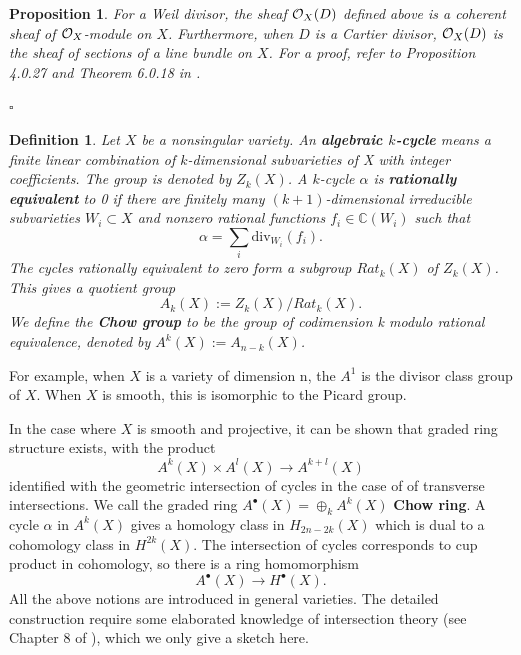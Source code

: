 \documentclass[11pt]{article}
\newtheorem{prop}[thm]{Proposition}
\newtheorem{dfn}[thm]{Definition}
\newcommand{\cplx}{\mathbb C}
\newcommand{\calo}{{\cal O}}
\renewcommand{\qedsymbol}{$\square$}
\begin{document}
\begin{prop}
For a Weil divisor, the sheaf $\calo_X(D)$ defined above is a coherent sheaf of $\calo_X$-module on $X$. Furthermore, when $D$ is a Cartier divisor, $\calo_X(D)$ is the sheaf of sections of a line bundle on $X$.
For a proof, refer to Proposition 4.0.27 and Theorem 6.0.18 in \cite{cox2009toric}. 
\begin{flushright}
	\qedsymbol
\end{flushright}
\end{prop}

\begin{dfn}

	Let $X$ be a nonsingular variety. An \textbf{algebraic $k$-cycle} means a finite linear combination of $k$-dimensional subvarieties of X with integer coefficients. The group is denoted by $Z_k(X)$. A $k$-cycle $\alpha$ is \textbf{rationally equivalent} to 0 if there are finitely many $(k+1)$-dimensional irreducible subvarieties $W_i\subset X$ and nonzero rational functions $f_i\in\cplx(W_i)$ such that
	\begin{equation*}
	\alpha=\sum_i \text{div}_{W_i}(f_i).
	\end{equation*}
	The cycles rationally equivalent to zero form a subgroup $Rat_k(X)$ of $Z_k(X)$. This gives a quotient group
	\begin{equation*}
		A_k(X):=Z_k(X)/Rat_k(X).
	\end{equation*}
	We define the \textbf{Chow group} to be the group of codimension k modulo rational equivalence, denoted by $A^k(X):=A_{n-k}(X)$.
\end{dfn}
For example, when $X$ is a variety of dimension n, the $A^1$ is the divisor class group of $X$. When $X$ is smooth, this is isomorphic to the Picard group.

In the case where $X$ is smooth and projective, it can be shown that graded ring structure exists, with the product
\begin{equation*}
	A^k(X)\times A^{l}(X)\rightarrow A^{k+l}(X)
\end{equation*}
identified with the geometric intersection of cycles in the case of of transverse intersections. We call the graded ring $A^{\bullet}(X)=\oplus_k A^k(X)$ \textbf{Chow ring}. A cycle $\alpha$ in $A^k(X)$ gives a homology class in $H_{2n-2k}(X)$ which is dual to a cohomology class in $H^{2k}(X)$. The intersection of cycles corresponds to cup product in cohomology, so there is a ring homomorphism
\begin{equation*}
	A^\bullet(X)\rightarrow H^\bullet(X).
\end{equation*}
All the above notions are introduced in general varieties. The detailed construction require some elaborated knowledge of intersection theory (see Chapter 8 of \cite{fulton2013intersection}), which we only give a sketch here.
\end{document}
